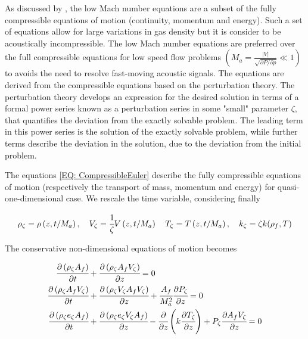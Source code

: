 \documentclass[../Article_Model_Parameters.tex]{subfiles}
\begin{document}
	
	As discussed by \citet{Lions2013}, the low Mach number equations are a subset of the fully compressible equations of motion (continuity, momentum and energy). Such a set of equations allow for large variations in gas density but it is consider to be acoustically incompressible. The low Mach number equations are preferred over the full compressible equations for low speed flow problems $\left( M_a = \frac{|V|}{\sqrt{ \partial P / \partial \rho }} \ll 1 \right)$ to avoids the need to resolve fast-moving acoustic signals. The equations are derived from the compressible equations based on the perturbation theory. The perturbation theory develops an expression for the desired solution in terms of a formal power series known as a perturbation series in some "small" parameter $\zeta$, that quantifies the deviation from the exactly solvable problem. The leading term in this power series is the solution of the exactly solvable problem, while further terms describe the deviation in the solution, due to the deviation from the initial problem. 
	
	The equations \ref{EQ: CompressibleEuler} describe the fully compressible equations of motion (respectively the transport of mass, momentum and energy) for quasi-one-dimensional case. We rescale the time variable, considering finally 
	
	{\footnotesize
		\begin{equation*}
			\rho_\zeta 	= \rho\left( z, t/M_a \right), \quad
			V_\zeta 	= \cfrac{1}{\zeta} V\left( z, t/M_a \right) \quad
			T_\zeta 	= T\left( z, t/M_a \right),  \quad 
			k_\zeta 	= \zeta k(\rho_f, T) 
		\end{equation*} 
	}
	
	The conservative non-dimensional equations of motion becomes
	
	{\footnotesize
		\begin{align*}
			\cfrac{\partial \left( \rho_\zeta A_f \right)}{\partial t} &+ \cfrac{\partial \left( \rho_\zeta A_f V_\zeta \right)}{\partial z} = 0 \\
			\cfrac{\partial \left( \rho_\zeta A_f V_\zeta \right) }{\partial t}	&+ \cfrac{\partial \left( \rho_\zeta V_\zeta A_f V_\zeta \right)}{\partial z} + \cfrac{A_f}{M_a^2} \cfrac{\partial P_\zeta}{\partial z} = 0\\
			\cfrac{\partial \left( \rho_\zeta e_\zeta A_f \right) }{\partial t} &+ \cfrac{\partial \left( \rho_\zeta e_\zeta V_\zeta A_f \right)}{\partial z} - \cfrac{\partial}{\partial z} \left( k \cfrac{\partial T_\zeta}{\partial z} \right) + P_\zeta \cfrac{\partial A_f V_\zeta}{\partial z} = 0
		\end{align*}
	}
\end{document}
